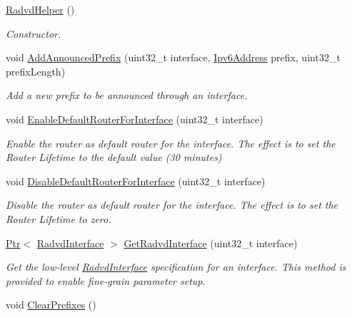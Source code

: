 \begin{DoxyCompactItemize}
\item 
\hyperlink{classns3_1_1RadvdHelper_a7816b46feca912d398b8a8ce58b6157b}{Radvd\+Helper} ()
\begin{DoxyCompactList}\small\item\em Constructor. \end{DoxyCompactList}\item 
void \hyperlink{classns3_1_1RadvdHelper_a5054b12c8a05bef58f554b237a29acab}{Add\+Announced\+Prefix} (uint32\+\_\+t interface, \hyperlink{classns3_1_1Ipv6Address}{Ipv6\+Address} prefix, uint32\+\_\+t prefix\+Length)
\begin{DoxyCompactList}\small\item\em Add a new prefix to be announced through an interface. \end{DoxyCompactList}\item 
void \hyperlink{classns3_1_1RadvdHelper_a3827fda2bcdef2ac285839e60f68739c}{Enable\+Default\+Router\+For\+Interface} (uint32\+\_\+t interface)
\begin{DoxyCompactList}\small\item\em Enable the router as default router for the interface. The effect is to set the Router Lifetime to the default value (30 minutes) \end{DoxyCompactList}\item 
void \hyperlink{classns3_1_1RadvdHelper_a8ae4a58d204cd55806f80829ad7b6dab}{Disable\+Default\+Router\+For\+Interface} (uint32\+\_\+t interface)
\begin{DoxyCompactList}\small\item\em Disable the router as default router for the interface. The effect is to set the Router Lifetime to zero. \end{DoxyCompactList}\item 
\hyperlink{classns3_1_1Ptr}{Ptr}$<$ \hyperlink{classns3_1_1RadvdInterface}{Radvd\+Interface} $>$ \hyperlink{classns3_1_1RadvdHelper_af563901fc907f016bfc1dad5485b59cc}{Get\+Radvd\+Interface} (uint32\+\_\+t interface)
\begin{DoxyCompactList}\small\item\em Get the low-\/level \hyperlink{classns3_1_1RadvdInterface}{Radvd\+Interface} specification for an interface. This method is provided to enable fine-\/grain parameter setup. \end{DoxyCompactList}\item 
void \hyperlink{classns3_1_1RadvdHelper_af9d8a4e0f91339d1b60876c05c472b3b}{Clear\+Prefixes} ()

\end{DoxyCompactItemize}

